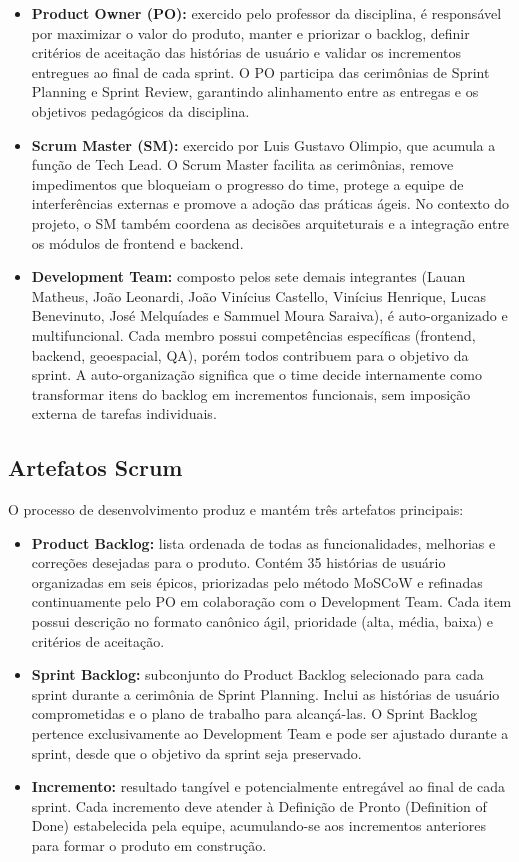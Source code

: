 \documentclass[12pt, a4paper]{article}
\begin{document}
\begin{itemize}
  \item \textbf{Product Owner (PO):} exercido pelo professor da disciplina, é responsável por maximizar o valor do produto, manter e priorizar o backlog, definir critérios de aceitação das histórias de usuário e validar os incrementos entregues ao final de cada sprint. O PO participa das cerimônias de Sprint Planning e Sprint Review, garantindo alinhamento entre as entregas e os objetivos pedagógicos da disciplina.
  \item \textbf{Scrum Master (SM):} exercido por Luis Gustavo Olimpio, que acumula a função de Tech Lead. O Scrum Master facilita as cerimônias, remove impedimentos que bloqueiam o progresso do time, protege a equipe de interferências externas e promove a adoção das práticas ágeis. No contexto do projeto, o SM também coordena as decisões arquiteturais e a integração entre os módulos de frontend e backend.
  \item \textbf{Development Team:} composto pelos sete demais integrantes (Lauan Matheus, João Leonardi, João Vinícius Castello, Vinícius Henrique, Lucas Benevinuto, José Melquíades e Sammuel Moura Saraiva), é auto-organizado e multifuncional. Cada membro possui competências específicas (frontend, backend, geoespacial, QA), porém todos contribuem para o objetivo da sprint. A auto-organização significa que o time decide internamente como transformar itens do backlog em incrementos funcionais, sem imposição externa de tarefas individuais.
\end{itemize}

\subsection{Artefatos Scrum}

O processo de desenvolvimento produz e mantém três artefatos principais:

\begin{itemize}
  \item \textbf{Product Backlog:} lista ordenada de todas as funcionalidades, melhorias e correções desejadas para o produto. Contém 35 histórias de usuário organizadas em seis épicos, priorizadas pelo método MoSCoW e refinadas continuamente pelo PO em colaboração com o Development Team. Cada item possui descrição no formato canônico ágil, prioridade (alta, média, baixa) e critérios de aceitação.
  \item \textbf{Sprint Backlog:} subconjunto do Product Backlog selecionado para cada sprint durante a cerimônia de Sprint Planning. Inclui as histórias de usuário comprometidas e o plano de trabalho para alcançá-las. O Sprint Backlog pertence exclusivamente ao Development Team e pode ser ajustado durante a sprint, desde que o objetivo da sprint seja preservado.
  \item \textbf{Incremento:} resultado tangível e potencialmente entregável ao final de cada sprint. Cada incremento deve atender à Definição de Pronto (Definition of Done) estabelecida pela equipe, acumulando-se aos incrementos anteriores para formar o produto em construção.
\end{itemize}
\end{document}
